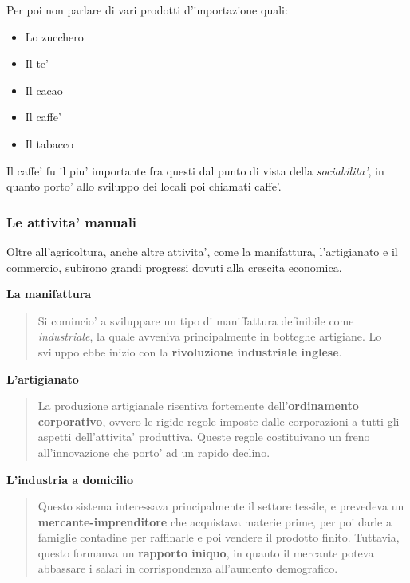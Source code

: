 \documentclass{article}
\begin{document}
{{    Per poi non parlare di vari prodotti d'importazione quali:

    \begin{itemize}
      \item Lo zucchero
      \item Il te'
      \item Il cacao
      \item Il caffe'
      \item Il tabacco
    \end{itemize}

    Il caffe' fu il piu' importante fra questi dal punto di vista della \textit{sociabilita'}, in quanto porto' allo sviluppo dei locali poi chiamati caffe'.

    \subsubsection{Le attivita' manuali} %
    Oltre all'agricoltura, anche altre attivita', come la manifattura, l'artigianato e il commercio, subirono grandi progressi dovuti alla crescita economica.

    \textbf{La manifattura}
    \begin{quote}
      Si comincio' a sviluppare un tipo di maniffattura definibile come \textit{industriale}, la quale avveniva principalmente in botteghe artigiane. Lo sviluppo ebbe inizio con la \textbf{rivoluzione industriale inglese}.
    \end{quote}

    \textbf{L'artigianato}
    \begin{quote}
      La produzione artigianale risentiva fortemente dell'\textbf{ordinamento corporativo}, ovvero le rigide regole imposte dalle corporazioni a tutti gli aspetti dell'attivita' produttiva. Queste regole costituivano un freno all'innovazione che porto' ad un rapido declino.
    \end{quote}

    \textbf{L'industria a domicilio}
    \begin{quote}
      Questo sistema interessava principalmente il settore tessile, e prevedeva un \textbf{mercante-imprenditore} che acquistava materie prime, per poi darle a famiglie contadine per raffinarle e poi vendere il prodotto finito. Tuttavia, questo formanva un \textbf{rapporto iniquo}, in quanto il mercante poteva abbassare i salari in corrispondenza all'aumento demografico.
    \end{quote}

}}
\end{document}
